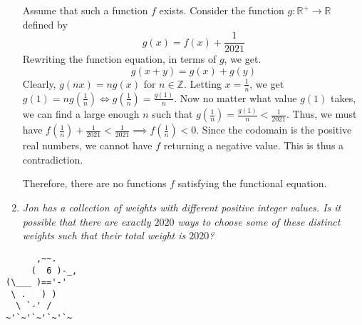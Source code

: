 \documentclass{article}
\begin{document}
\begin{enumerate}[1.]
Assume that such a function $f$ exists. Consider the function $g: \mathbb{R}^+ \rightarrow \mathbb{R}$ defined by 
$$g(x) = f(x) + \frac{1}{2021}$$
Rewriting the function equation, in terms of $g$, we get. 
$$g(x + y) = g(x) + g(y)$$
Clearly, $g(nx) = ng(x)$ for $n \in \mathbb{Z}$. Letting $x = \frac{1}{n}$, we get $g(1) = ng(\frac{1}{n}) \iff g(\frac{1}{n}) = \frac{g(1)}{n}$. Now no matter what value $g(1)$ takes, we can find a large enough $n$ such that $g(\frac{1}{n}) = \frac{g(1)}{n} < \frac{1}{2021}$. Thus, we must have $f(\frac{1}{n}) + \frac{1}{2021} < \frac{1}{2021} \implies f(\frac{1}{n}) < 0$. Since the codomain is the positive real numbers, we cannot have $f$ returning a negative value. This is thus a contradiction.

Therefore, there are no functions $f$ satisfying the functional equation.


\item %
{\itshape Jon has a collection of weights with different positive integer values. Is it possible that there are exactly $2020$ ways to choose some of these distinct weights such that their total weight is $2020$?}

\end{enumerate}


\vfill
\centering
\begin{BVerbatim}
      ,~~.
     (  6 )-_,
(\___ )=='-'
 \ .   ) )
  \ `-' /    
~'`~'`~'`~'`~
\end{BVerbatim}
\end{document}
